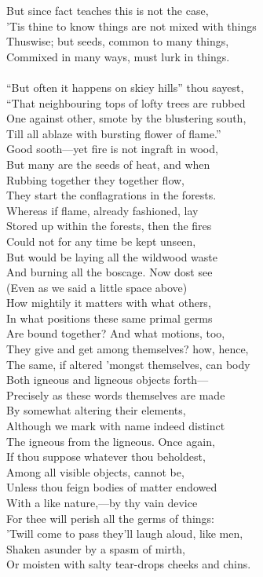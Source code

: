 But since fact teaches this is not the case,\\
'Tis thine to know things are not mixed with things\\
Thuswise; but seeds, common to many things,\\
Commixed in many ways, must lurk in things.\\
\\
``But often it happens on skiey hills'' thou sayest,\\
``That neighbouring tops of lofty trees are rubbed\\
One against other, smote by the blustering south,\\
Till all ablaze with bursting flower of flame.''\\
Good sooth—yet fire is not ingraft in wood,\\
But many are the seeds of heat, and when\\
Rubbing together they together flow,\\
They start the conflagrations in the forests.\\
Whereas if flame, already fashioned, lay\\
Stored up within the forests, then the fires\\
Could not for any time be kept unseen,\\
But would be laying all the wildwood waste\\
And burning all the boscage. Now dost see\\
(Even as we said a little space above)\\
How mightily it matters with what others,\\
In what positions these same primal germs\\
Are bound together? And what motions, too,\\
They give and get among themselves? how, hence,\\
The same, if altered 'mongst themselves, can body\\
Both igneous and ligneous objects forth—\\
Precisely as these words themselves are made\\
By somewhat altering their elements,\\
Although we mark with name indeed distinct\\
The igneous from the ligneous. Once again,\\
If thou suppose whatever thou beholdest,\\
Among all visible objects, cannot be,\\
Unless thou feign bodies of matter endowed\\
With a like nature,—by thy vain device\\
For thee will perish all the germs of things:\\
'Twill come to pass they'll laugh aloud, like men,\\
Shaken asunder by a spasm of mirth,\\
Or moisten with salty tear-drops cheeks and chins.

